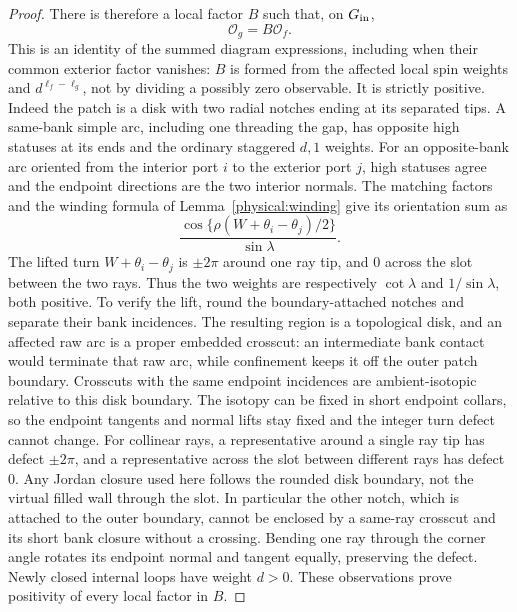 \begin{proof}
There is therefore a local factor $B$ such that, on $G_{\rm in}$,
\begin{equation}
 \mathcal O_g=B\mathcal O_f.
 \label{obs:gap-local-equality}
\end{equation}
This is an identity of the summed diagram expressions, including
when their common exterior factor vanishes: $B$ is formed from
the affected local spin weights and $d^{\ell_f-\ell_g}$, not by
dividing a possibly zero observable.  It is strictly positive.
Indeed the patch is a disk with two radial notches ending at its
separated tips.  A same-bank simple arc, including one threading
the gap, has opposite high statuses at its ends and the ordinary
staggered $d,1$ weights.  For an opposite-bank arc oriented from
the interior port $i$ to the exterior port $j$, high statuses
agree and the endpoint directions are the two interior normals.
The matching factors and the winding formula of
Lemma~\ref{physical:winding} give its orientation sum as
\begin{equation}
 \frac{\cos\{\rho(W+\theta_i-\theta_j)/2\}}{\sin\lambda}.
 \label{obs:opposite-bank-amplitude}
\end{equation}
The lifted turn $W+\theta_i-\theta_j$ is $\pm2\pi$ around one
ray tip, and $0$ across the slot between the two rays.  Thus the
two weights are respectively $\cot\lambda$ and $1/\sin\lambda$,
both positive.  To verify the lift, round the boundary-attached
notches and separate their bank incidences.  The resulting region
is a topological disk, and an affected raw arc is a proper embedded
crosscut: an intermediate bank contact would terminate that raw
arc, while confinement keeps it off the outer patch boundary.
Crosscuts with the same endpoint incidences are ambient-isotopic
relative to this disk boundary.  The isotopy can be fixed in short
endpoint collars, so the endpoint tangents and normal lifts stay
fixed and the integer turn defect cannot change.  For collinear
rays, a representative around a single ray tip has defect
$\pm2\pi$, and a representative across the slot between different
rays has defect $0$.  Any Jordan closure used here follows the
rounded disk boundary, not the virtual filled wall through the
slot.  In particular the other notch, which is attached to the
outer boundary, cannot be enclosed by a same-ray crosscut and its
short bank closure without a crossing.  Bending one ray through
the corner angle rotates its endpoint normal and tangent equally,
preserving the defect.  Newly closed
internal loops have weight $d>0$.  These observations prove
positivity of every local factor in $B$.


\end{proof}
